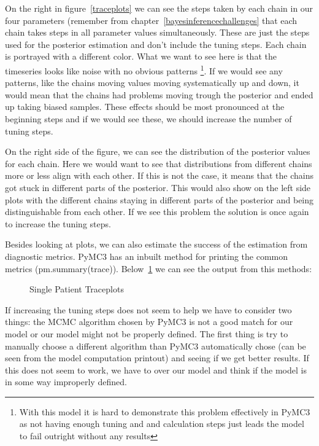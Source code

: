 \documentclass[12pt,a4paper,leqno]{report}
\theoremstyle{plain}
\theoremstyle{definition}
\theoremstyle{remark}
\begin{document}
On the right in figure\ \ref{traceplots} we can see the steps taken by each
chain in our four parameters (remember from chapter\ \ref{bayesinferencechallenges} that
each chain takes steps in all parameter values simultaneously. These are
just the steps used for the posterior estimation and don't include the tuning steps. Each
chain is portrayed with a different color. What we want to see here is that the timeseries
looks like noise with no obvious patterns \footnote{With this model it is hard to
demonstrate this problem effectively in PyMC3 as not having enough tuning and and calculation steps just leads
the model to fail outright without any results}. If we would see any patterns, like the chains
moving values moving systematically up and down, it would mean that the
chains had problems moving trough the posterior and ended up taking biased samples.
These effects should be most pronounced at the beginning steps and if we would see
these, we should increase the number of tuning steps.

On the right side of the figure, we can see the distribution of the posterior values for each chain. Here we
would want to see that distributions from different chains more or less align with
each other. If this is not the case, it means that the chains got stuck in different
parts of the posterior. This would also show on the left side plots with the different
chains staying in different parts of the posterior and being distinguishable from each
other. If we see this problem the solution is once again to increase the tuning steps.

Besides looking at plots, we can also estimate the success of the estimation from
diagnostic metrics. PyMC3 has an inbuilt method for printing the common metrics
(pm.summary(trace)). Below\ \ref{singlepatientdiagnosticmetrics} we can see the output from this methods:

\bigskip
\begin{figure}[H]
    \caption{Single Patient Traceplots}
    \label{singlepatientdiagnosticmetrics}
    \bigskip
    
\end{figure}
\bigskip


If increasing the tuning steps does not seem to help we have to consider two things: the
MCMC algorithm chosen by PyMC3 is not a good match for our model or our model might not
be properly defined. The first thing is try to manually choose a different algorithm than
PyMC3 automatically chose (can be seen from the model computation printout) and seeing
if we get better results. If this does not seem to work, we have to over our model and
think if the model is in some way improperly defined.
\end{document}
